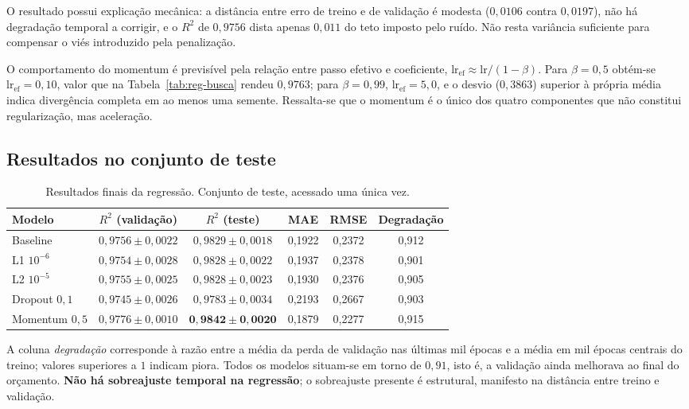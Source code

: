\documentclass[11pt,a4paper]{article}
\begin{document}
O resultado possui explicação mecânica: a distância entre erro de treino e de validação
é modesta ($0{,}0106$ contra $0{,}0197$), não há degradação temporal a corrigir, e o
$R^2$ de $0{,}9756$ dista apenas $0{,}011$ do teto imposto pelo ruído. Não resta
variância suficiente para compensar o viés introduzido pela penalização.

O comportamento do momentum é previsível pela relação entre passo efetivo e coeficiente,
$\text{lr}_{\text{ef}} \approx \text{lr}/(1-\beta)$. Para $\beta = 0{,}5$ obtém-se
$\text{lr}_{\text{ef}} = 0{,}10$, valor que na Tabela~\ref{tab:reg-busca} rendeu
$0{,}9763$; para $\beta = 0{,}99$, $\text{lr}_{\text{ef}} = 5{,}0$, e o desvio
($0{,}3863$) superior à própria média indica divergência completa em ao menos uma
semente. Ressalta-se que o momentum é o único dos quatro componentes que não constitui
regularização, mas aceleração.

\subsection{Resultados no conjunto de teste}

\begin{table}[htbp]
\centering
\caption{Resultados finais da regressão. Conjunto de teste, acessado uma única vez.}
\label{tab:reg-teste}
\begin{tabular}{lccccc}
\toprule
Modelo & $R^2$ (validação) & $R^2$ (teste) & MAE & RMSE & Degradação \\
\midrule
Baseline      & $0{,}9756 \pm 0{,}0022$ & $0{,}9829 \pm 0{,}0018$ & 0{,}1922 & 0{,}2372 & 0{,}912 \\
L1 $10^{-6}$  & $0{,}9754 \pm 0{,}0028$ & $0{,}9828 \pm 0{,}0022$ & 0{,}1937 & 0{,}2378 & 0{,}901 \\
L2 $10^{-5}$  & $0{,}9755 \pm 0{,}0025$ & $0{,}9828 \pm 0{,}0023$ & 0{,}1930 & 0{,}2376 & 0{,}905 \\
Dropout $0{,}1$ & $0{,}9745 \pm 0{,}0026$ & $0{,}9783 \pm 0{,}0034$ & 0{,}2193 & 0{,}2667 & 0{,}903 \\
Momentum $0{,}5$ & $0{,}9776 \pm 0{,}0010$ & $\mathbf{0{,}9842 \pm 0{,}0020}$ & 0{,}1879 & 0{,}2277 & 0{,}915 \\
\bottomrule
\end{tabular}
\end{table}

A coluna \emph{degradação} corresponde à razão entre a média da perda de validação nas
últimas mil épocas e a média em mil épocas centrais do treino; valores superiores a
$1$ indicam piora. Todos os modelos situam-se em torno de $0{,}91$, isto é, a validação
ainda melhorava ao final do orçamento. \textbf{Não há sobreajuste temporal na
regressão}; o sobreajuste presente é estrutural, manifesto na distância entre treino e
validação.
\end{document}
